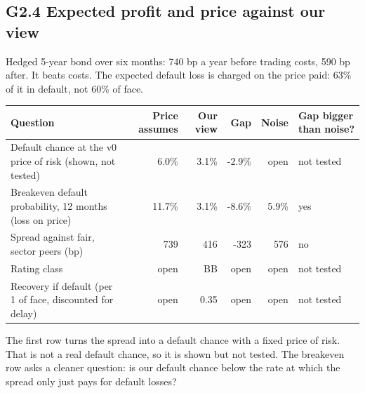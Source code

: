 \documentclass[11pt,a4paper]{article}
\begin{document}
\subsection*{G2.4 Expected profit and price against our view}
Hedged 5-year bond over six months: 740 bp a year before trading costs, 590 bp after. It beats costs. The expected default loss is charged on the price paid: 63\% of it in default, not 60\% of face.
\begin{center}\footnotesize\setlength{\tabcolsep}{3.5pt}\begin{tabular}{@{}p{5.2cm}rrrrl@{}}\toprule
Question & Price assumes & Our view & Gap & Noise & Gap bigger than noise? \\\midrule
Default chance at the v0 price of risk (shown, not tested) & 6.0\% & 3.1\% & -2.9\% & open & not tested \\
Breakeven default probability, 12 months (loss on price) & 11.7\% & 3.1\% & -8.6\% & 5.9\% & yes \\
Spread against fair, sector peers (bp) & 739 & 416 & -323 & 576 & no \\
Rating class & open & BB & open & open & not tested \\
Recovery if default (per 1 of face, discounted for delay) & open & 0.35 & open & open & not tested \\
\bottomrule\end{tabular}\end{center}
The first row turns the spread into a default chance with a fixed price of risk. That is not a real default chance, so it is shown but not tested. The breakeven row asks a cleaner question: is our default chance below the rate at which the spread only just pays for default losses?
\end{document}
